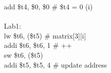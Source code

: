 \documentclass[../main.tex]{subfiles}
\begin{document}
{    \hspace*{4mm} \hspace*{0cm} \hspace*{0cm} \hspace*{0cm} \hspace*{0cm} add \$t4, \$0, \$0 \hspace*{0cm} \hspace*{0cm} \hspace*{0cm} \hspace*{0cm} \# \$t4 = 0 (i) \\
    \\
    \hspace*{4mm} Lab1: \\
    \hspace*{4mm} \hspace*{0cm} \hspace*{0cm} \hspace*{0cm} \hspace*{0cm} lw \$t6, (\$t5) \hspace*{0cm} \hspace*{0cm} \hspace*{0cm} \hspace*{0cm} \hspace*{0cm} \hspace*{0cm} \# matrix[3][i] \\
    \hspace*{4mm} \hspace*{0cm} \hspace*{0cm} \hspace*{0cm} \hspace*{0cm} addi \$t6, \$t6, 1 \hspace*{0cm} \hspace*{0cm} \hspace*{0cm} \# ++ \\
    \hspace*{4mm} \hspace*{0cm} \hspace*{0cm} \hspace*{0cm} \hspace*{0cm} sw \$t6, (\$t5) \\
    \hspace*{4mm} \hspace*{0cm} \hspace*{0cm} \hspace*{0cm} \hspace*{0cm} addi \$t5, \$t5, 4 \hspace*{0cm} \hspace*{0cm} \hspace*{0cm} \# update address \\
}
\end{document}
